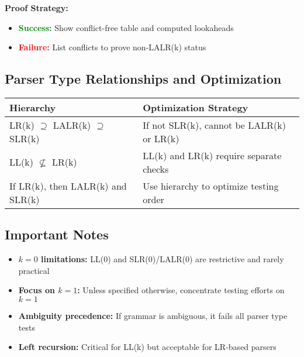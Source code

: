 \textbf{Proof Strategy:}
\begin{itemize}
    \item \textcolor{green}{\textbf{Success:}} Show conflict-free table and computed lookaheads
    \item \textcolor{red}{\textbf{Failure:}} List conflicts to prove non-LALR(k) status
\end{itemize}

\subsection{Parser Type Relationships and Optimization}

\begin{center}
\begin{tabular}{|l|l|}
\hline
\textbf{Hierarchy} & \textbf{Optimization Strategy} \\
\hline
LR(k) $\supseteq$ LALR(k) $\supseteq$ SLR(k) & If not SLR(k), cannot be LALR(k) or LR(k) \\
\hline
LL(k) $\not\subseteq$ LR(k) & LL(k) and LR(k) require separate checks \\
\hline
If LR(k), then LALR(k) and SLR(k) & Use hierarchy to optimize testing order \\
\hline
\end{tabular}
\end{center}


\subsection{Important Notes}

\begin{itemize}
    \item \textbf{$k = 0$ limitations:} LL(0) and SLR(0)/LALR(0) are restrictive and rarely practical
    \item \textbf{Focus on $k = 1$:} Unless specified otherwise, concentrate testing efforts on $k = 1$
    \item \textbf{Ambiguity precedence:} If grammar is ambiguous, it fails all parser type tests
    \item \textbf{Left recursion:} Critical for LL(k) but acceptable for LR-based parsers
\end{itemize}